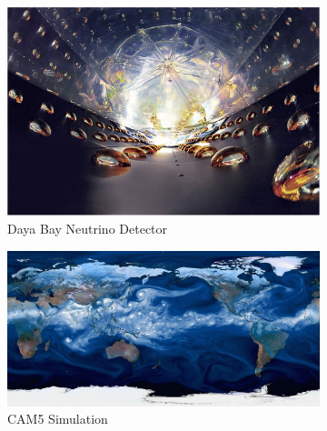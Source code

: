 \begin{figure}
\centering
\begin{subfigure}[b]{0.32\textwidth}
\includegraphics[width=\textwidth]{fig/dayabay.jpg}
\caption{Daya Bay Neutrino Detector}
\label{fig:dayabay}
\end{subfigure}
\begin{subfigure}[b]{0.42\textwidth}
\includegraphics[width=\textwidth]{fig/climate.png}
\caption{CAM5 Simulation}
\label{fig:cam5}
\end{subfigure}
\begin{subfigure}[b]{0.22\textwidth}

\end{subfigure}
\end{figure}
